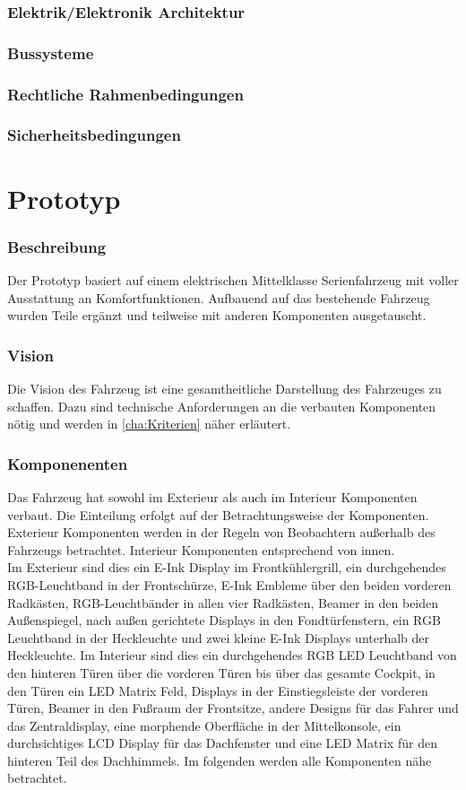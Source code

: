 \subsection{Elektrik/Elektronik Architektur}
\subsection{Bussysteme}
\subsection{Rechtliche Rahmenbedingungen}
\subsection{Sicherheitsbedingungen}


\chapter{Prototyp}
\label{cha:Prototyp}
\subsection{Beschreibung}
Der Prototyp basiert auf einem elektrischen Mittelklasse Serienfahrzeug mit voller Ausstattung an Komfortfunktionen. Aufbauend auf das bestehende Fahrzeug wurden Teile ergänzt und teilweise mit anderen Komponenten ausgetauscht.
\subsection{Vision}
Die Vision des Fahrzeug ist eine gesamtheitliche Darstellung des Fahrzeuges zu schaffen. Dazu sind technische Anforderungen an die verbauten Komponenten nötig und werden in \ref{cha:Kriterien} näher erläutert.
\subsection{Komponenenten}
Das Fahrzeug hat sowohl im Exterieur als auch im Interieur Komponenten verbaut. Die Einteilung erfolgt auf der Betrachtungsweise der Komponenten. Exterieur Komponenten werden in der Regeln von Beobachtern außerhalb des Fahrzeugs betrachtet. Interieur Komponenten entsprechend von innen.\\
Im Exterieur sind dies ein E-Ink Display im Frontkühlergrill, ein durchgehendes RGB-Leuchtband in der Frontschürze, E-Ink Embleme über den beiden vorderen Radkästen, RGB-Leuchtbänder in allen vier Radkästen, Beamer in den beiden Außenspiegel, nach außen gerichtete Displays in den Fondtürfenstern, ein RGB Leuchtband in der Heckleuchte und zwei kleine E-Ink Displays unterhalb der Heckleuchte.
Im Interieur sind dies ein durchgehendes RGB LED Leuchtband von den hinteren Türen über die vorderen Türen bis über das gesamte Cockpit, in den Türen ein LED Matrix Feld, Displays in der Einstiegsleiste der vorderen Türen, Beamer in den Fußraum der Frontsitze, andere Designs für das Fahrer und das Zentraldisplay, eine morphende Oberfläche in der Mittelkonsole, ein durchsichtiges LCD Display für das Dachfenster und eine LED Matrix für den hinteren Teil des Dachhimmels.
Im folgenden werden alle Komponenten nähe betrachtet.
